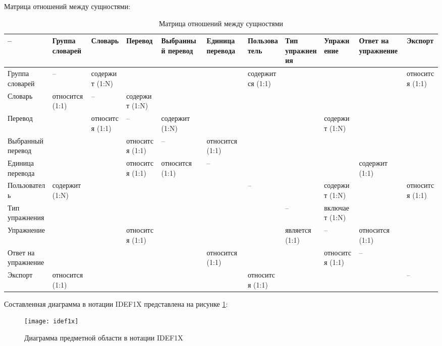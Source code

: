 \documentclass[a4paper,14pt]{extarticle}
\begin{document}
Матрица отношений между сущностями:

\begin{landscape}
\begin{table}[H]
    \footnotesize
    \caption{Матрица отношений между сущностями}
    \begin{tabular}{ | p{1.9cm} | p{1.9cm} | p{1.9cm} | p{1.9cm} | p{1.9cm} | p{1.9cm} | p{1.9cm} | p{1.9cm} | p{1.9cm} | p{1.9cm} | p{1.9cm} | }
        \hline
        -- & Группа словарей & Словарь & Перевод & Выбранный перевод & Единица перевода  & Пользователь & Тип упражнения & Упражнение & Ответ на упражнение & Экспорт \\ \hline
        Группа словарей & -- & содержит (1:N) & & & & содержится (1:1) & & & & относится (1:1) \\ \hline
        Словарь & относится (1:1) & -- & содержит (1:N) & & & & & & & \\ \hline
        Перевод & & относится (1:1) & -- & содержит (1:N) & & & & содержит (1:N) & & \\ \hline
        Выбранный перевод & & & относится (1:1) & -- & относится (1:1) & & & & & \\ \hline
        Единица перевода & & & относится (1:1) & относится (1:1) & -- & & & & содержит (1:1) & \\ \hline
        Пользователь & содержит (1:N) & & & & & -- & & содержит (1:N) & & относится (1:1) \\ \hline
        Тип упражнения & & & & & & & -- & включает (1:N) & & \\ \hline
        Упражнение & & & относится (1:1) & & & & является (1:1) & -- & относится (1:1) & \\ \hline
        Ответ на упражнение & & & & & относится (1:1) & & & относится (1:1) & -- & \\ \hline
        Экспорт & относится (1:1) & & & & & относится (1:1) & & & & -- \\ \hline
    \end{tabular}
\end{table}
\pagebreak
\end{landscape}

Составленная диаграмма в нотации IDEF1X представлена на рисунке
\ref{fig:idef1x}:

\begin{figure}[H]
    \centering
    \texttt{[image: idef1x]}
    \caption{Диаграмма предметной области в нотации IDEF1X}
    \label{fig:idef1x}
\end{figure}
\end{document}
